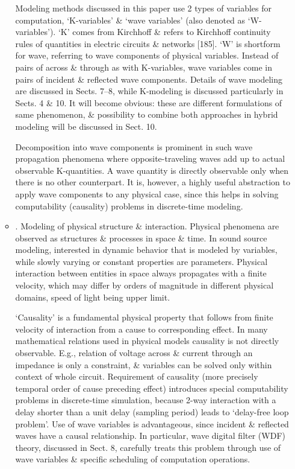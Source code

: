\documentclass{article}
\begin{document}
\begin{itemize}
\begin{itemize}
		Modeling methods discussed in this paper use 2 types of variables for computation, `K-variables' \& `wave variables' (also denoted as `W-variables'). `K' comes from Kirchhoff \& refers to Kirchhoff continuity rules of quantities in electric circuits \& networks [185]. `W' is shortform for wave, referring to wave components of physical variables. Instead of pairs of across \& through as with K-variables, wave variables come in pairs of incident \& reflected wave components. Details of wave modeling are discussed in Sects. 7--8, while K-modeling is discussed particularly in Sects. 4 \& 10. It will become obvious: these are different formulations of same phenomenon, \& possibility to combine both approaches in hybrid modeling will be discussed in Sect. 10.
		
		Decomposition into wave components is prominent in such wave propagation phenomena where opposite-traveling waves add up to actual observable K-quantities. A wave quantity is directly observable only when there is no other counterpart. It is, however, a highly useful abstraction to apply wave components to any physical case, since this helps in solving computability (causality) problems in discrete-time modeling.
		\item {. Modeling of physical structure \& interaction.} Physical phenomena are observed as structures \& processes in space \& time. In sound source modeling, interested in dynamic behavior that is modeled by variables, while slowly varying or constant properties are parameters. Physical interaction between entities in space always propagates with a finite velocity, which may differ by orders of magnitude in different physical domains, speed of light being upper limit.
		
		`Causality' is a fundamental physical property that follows from finite velocity of interaction from a cause to corresponding effect. In many mathematical relations used in physical models causality is not directly observable. E.g., relation of voltage across \& current through an impedance is only a constraint, \& variables can be solved only within context of whole circuit. Requirement of causality (more precisely temporal order of cause preceding effect) introduces special computability problems in discrete-time simulation, because 2-way interaction with a delay shorter than a unit delay (sampling period) leads to `delay-free loop problem'. Use of wave variables is advantageous, since incident \& reflected waves have a causal relationship. In particular, wave digital filter (WDF) theory, discussed in Sect. 8, carefully treats this problem through use of wave variables \& specific scheduling of computation operations.
		

\end{itemize}
\end{itemize}
\end{document}
